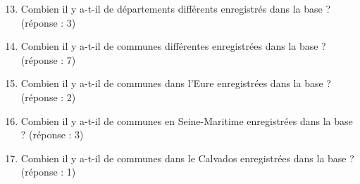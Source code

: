 \documentclass[a4paper,12pt,french]{book}
\begin{document}
\begin{exercice}[ : Collectivites.db]
\begin{enumerate}[\bfseries 1.]
	\setcounter{enumi}{12}
\item  Combien il y a-t-il de départements différents enregistrés dans la base ? (réponse : 3)
\item Combien il y a-t-il de communes différentes enregistrées dans la base ? (réponse : 7)
\item Combien il y a-t-il de communes dans l’Eure enregistrées dans la base ? (réponse : 2)
\item  Combien il y a-t-il de communes en Seine-Maritime enregistrées dans la base ? (réponse : 3)
\item Combien il y a-t-il de communes dans le Calvados enregistrées dans la base ? (réponse : 1)
\end{enumerate}
\end{exercice}
\end{document}
